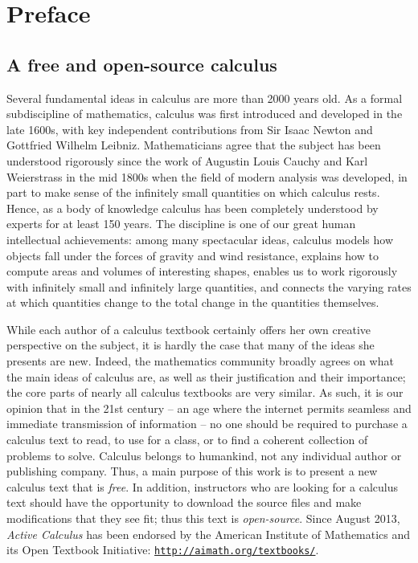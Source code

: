 \chapter{Preface} 

\section*{A free and open-source calculus \ } 

\vspace*{-0.15in}

Several fundamental ideas in calculus are more than 2000 years old.  As a formal subdiscipline of mathematics, calculus was first introduced and developed in the late 1600s, with key independent contributions from Sir Isaac Newton and Gottfried Wilhelm Leibniz.  Mathematicians agree that the subject has been understood rigorously since the work of Augustin Louis Cauchy and Karl Weierstrass in the mid 1800s when the field of modern analysis was developed, in part to make sense of the infinitely small quantities on which calculus rests.  Hence, as a body of knowledge calculus has been completely understood by experts for at least 150 years.  The discipline is one of our great human intellectual achievements:  among many spectacular ideas, calculus models how objects fall under the forces of gravity and wind resistance, explains how to compute areas and volumes of interesting shapes, enables us to work rigorously with infinitely small and infinitely large quantities, and connects the varying rates at which quantities change to the total change in the quantities themselves.

While each author of a calculus textbook certainly offers her own creative perspective on the subject, it is hardly the case that many of the ideas she presents are new.  Indeed, the mathematics community broadly agrees on what the main ideas of calculus are, as well as their justification and their importance; the core parts of nearly all calculus textbooks are very similar.  As such, it is our opinion that in the 21st century -- an age where the internet permits seamless and immediate transmission of information -- no one should be required to purchase a calculus text to read, to use for a class, or to find a coherent collection of problems to solve.  Calculus belongs to humankind, not any individual author or publishing company.  Thus, a main purpose of this work is to present a new calculus text that is \emph{free}.  In addition, instructors who are looking for a calculus text should have the opportunity to download the source files and make modifications that they see fit; thus this text is \emph{open-source}.  Since August 2013, \emph{Active Calculus} has been endorsed by the American Institute of Mathematics and its Open Textbook Initiative: \href{http://aimath.org/textbooks/}{\texttt{http://aimath.org/textbooks/}}.

